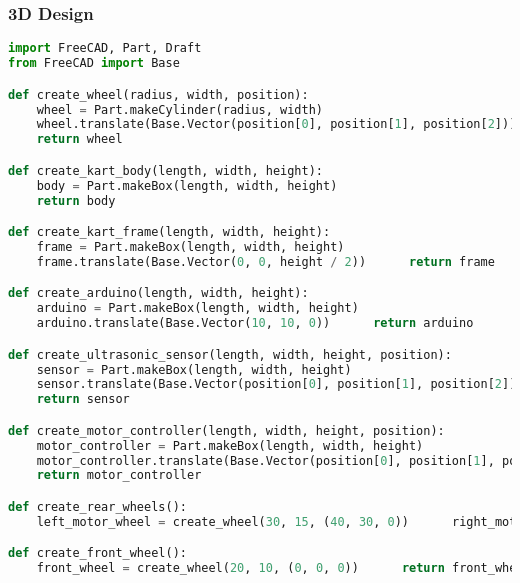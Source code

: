 \documentclass[a4paper,12pt]{article}
\begin{document}
\subsubsection{3D Design}
\begin{lstlisting}[language=Python]
import FreeCAD, Part, Draft
from FreeCAD import Base

def create_wheel(radius, width, position):
    wheel = Part.makeCylinder(radius, width)
    wheel.translate(Base.Vector(position[0], position[1], position[2]))
    return wheel

def create_kart_body(length, width, height):
    body = Part.makeBox(length, width, height)
    return body

def create_kart_frame(length, width, height):
    frame = Part.makeBox(length, width, height)
    frame.translate(Base.Vector(0, 0, height / 2))      return frame

def create_arduino(length, width, height):
    arduino = Part.makeBox(length, width, height)
    arduino.translate(Base.Vector(10, 10, 0))      return arduino

def create_ultrasonic_sensor(length, width, height, position):
    sensor = Part.makeBox(length, width, height)
    sensor.translate(Base.Vector(position[0], position[1], position[2]))
    return sensor

def create_motor_controller(length, width, height, position):
    motor_controller = Part.makeBox(length, width, height)
    motor_controller.translate(Base.Vector(position[0], position[1], position[2]))
    return motor_controller

def create_rear_wheels():
    left_motor_wheel = create_wheel(30, 15, (40, 30, 0))      right_motor_wheel = create_wheel(30, 15, (40, -30, 0))      return left_motor_wheel, right_motor_wheel

def create_front_wheel():
    front_wheel = create_wheel(20, 10, (0, 0, 0))      return front_wheel
\end{lstlisting}
\end{document}
